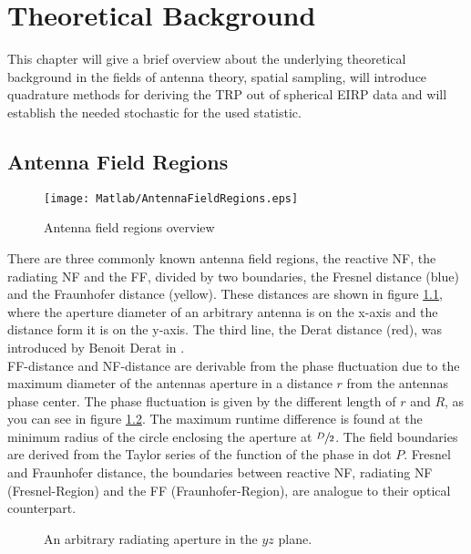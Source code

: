 \chapter{Theoretical Background}

This chapter will give a brief overview about the underlying theoretical background in the fields of antenna theory, spatial sampling, will introduce quadrature methods for deriving the \ac{TRP} out of spherical \ac{EIRP} data and will establish the needed stochastic for the used statistic.

\section{Antenna Field Regions}

\begin{figure}[H]
\centering
\texttt{[image: Matlab/AntennaFieldRegions.eps]}
\caption{Antenna field regions overview}
\label{fig:antennafieldreg}
\end{figure}

There are three commonly known antenna field regions, the reactive \ac{NF}, the radiating \ac{NF} and the \ac{FF}, divided by two boundaries, the Fresnel distance (blue) and the Fraunhofer distance (yellow). These distances are shown in figure \ref{fig:antennafieldreg}, where the aperture diameter of an arbitrary antenna is on the x-axis and the distance form it is on the y-axis. The third line, the Derat distance (red), was introduced by Benoit Derat in \cite{8393926}.\\
\ac{FF}-distance and \ac{NF}-distance are derivable from the phase fluctuation due to the maximum diameter of the antennas aperture \cite{7942128} in a distance $r$ from the antennas phase center. The phase fluctuation is given by the different length of $r$ and $R$, as you can see in figure \ref{fig:arbaperturexy}. The maximum runtime difference is found at the minimum radius of the circle enclosing the aperture at $\sfrac{D}{2}$. The field boundaries are derived from the Taylor series of the function of the phase in dot $P$. Fresnel and Fraunhofer distance, the boundaries between reactive \ac{NF}, radiating \ac{NF} (Fresnel-Region) and the \ac{FF} (Fraunhofer-Region), are analogue to their optical counterpart. \cite{7942128} \cite{balanis}

\begin{figure}[H]
\centering
\def\svgwidth{0.6\textwidth}

\caption{An arbitrary radiating aperture in the $yz$ plane. \cite{7942128}}
\label{fig:arbaperturexy}
\end{figure}

